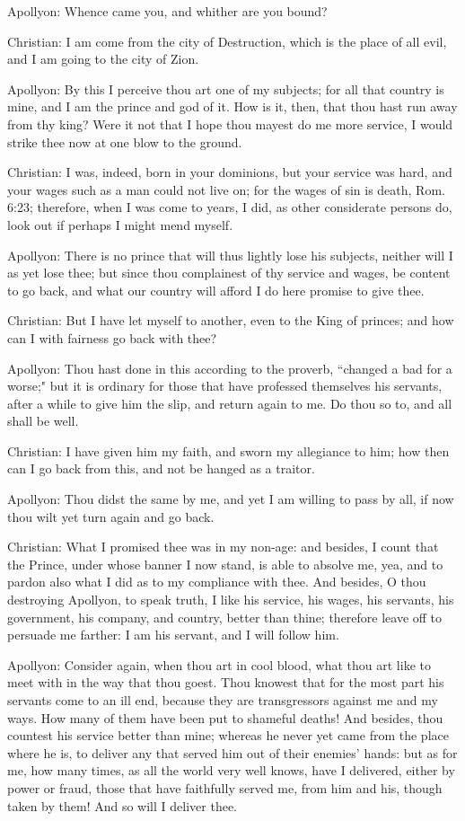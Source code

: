 Apollyon: Whence came you, and whither are you bound?

Christian: I am come from the city of Destruction, which is the place of all evil, and I am going to the city of Zion.

Apollyon: By this I perceive thou art one of my subjects; for all that country is mine, and I am the prince and god of it. How is it, then, that thou hast run away from thy king? Were it not that I hope thou mayest do me more service, I would strike thee now at one blow to the ground.

Christian: I was, indeed, born in your dominions, but your service was hard, and your wages such as a man could not live on; for the wages of sin is death, Rom. 6:23; therefore, when I was come to years, I did, as other considerate persons do, look out if perhaps I might mend myself.

Apollyon: There is no prince that will thus lightly lose his subjects, neither will I as yet lose thee; but since thou complainest of thy service and wages, be content to go back, and what our country will afford I do here promise to give thee.

Christian: But I have let myself to another, even to the King of princes; and how can I with fairness go back with thee?

Apollyon: Thou hast done in this according to the proverb, ``changed a bad for a worse;" but it is ordinary for those that have professed themselves his servants, after a while to give him the slip, and return again to me. Do thou so to, and all shall be well.

Christian: I have given him my faith, and sworn my allegiance to him; how then can I go back from this, and not be hanged as a traitor.

Apollyon: Thou didst the same by me, and yet I am willing to pass by all, if now thou wilt yet turn again and go back.

Christian: What I promised thee was in my non-age: and besides, I count that the Prince, under whose banner I now stand, is able to absolve me, yea, and to pardon also what I did as to my compliance with thee. And besides, O thou destroying Apollyon, to speak truth, I like his service, his wages, his servants, his government, his company, and country, better than thine; therefore leave off to persuade me farther: I am his servant, and I will follow him.

Apollyon: Consider again, when thou art in cool blood, what thou art like to meet with in the way that thou goest. Thou knowest that for the most part his servants come to an ill end, because they are transgressors against me and my ways. How many of them have been put to shameful deaths! And besides, thou countest his service better than mine; whereas he never yet came from the place where he is, to deliver any that served him out of their enemies' hands: but as for me, how many times, as all the world very well knows, have I delivered, either by power or fraud, those that have faithfully served me, from him and his, though taken by them! And so will I deliver thee.

